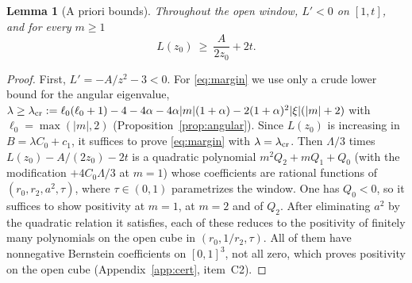 \documentclass[11pt]{amsart}
\newtheorem{lemma}[theorem]{Lemma}
\theoremstyle{definition}
\theoremstyle{remark}
\numberwithin{equation}{section}
\begin{document}
\begin{lemma}[A priori bounds]\label{lem:floor}
Throughout the open window, $L'<0$ on $[1,t]$, and for every $m\ge1$
\begin{equation}\label{eq:margin}
L(z_0)\ \ge\ \frac{A}{2z_0}+2t .
\end{equation}
\end{lemma}
\begin{proof}
First, $L'=-A/z^2-3<0$. For \eqref{eq:margin} we use only a crude lower bound for the angular eigenvalue,
$\lambda\ge\lambda_{\rm cr}:=\ell_0(\ell_0+1)-4-4\alpha-4\alpha|m|(1+\alpha)-2(1+\alpha)^2|\xi|(|m|+2)$ with
$\ell_0=\max(|m|,2)$ (Proposition~\ref{prop:angular}). Since $L(z_0)$ is increasing in $B=\lambda C_0+c_1$, it suffices to prove
\eqref{eq:margin} with $\lambda=\lambda_{\rm cr}$. Then $\Lambda/3$ times $L(z_0)-A/(2z_0)-2t$ is a quadratic polynomial
$m^2Q_2+mQ_1+Q_0$ (with the modification $+4C_0\Lambda/3$ at $m=1$) whose coefficients are rational functions of
$(r_0,r_2,a^2,\tau)$, where $\tau\in(0,1)$ parametrizes the window. One has $Q_0<0$, so it suffices to show positivity
at $m=1$, at $m=2$ and of $Q_2$. After eliminating $a^2$ by the quadratic relation it satisfies, each of these reduces
to the positivity of finitely many polynomials on the open cube in $(r_0,1/r_2,\tau)$. All of them have nonnegative
Bernstein coefficients on $[0,1]^3$, not all zero, which proves positivity on the open cube (Appendix~\ref{app:cert},
item~C2).
\end{proof}
\end{document}
